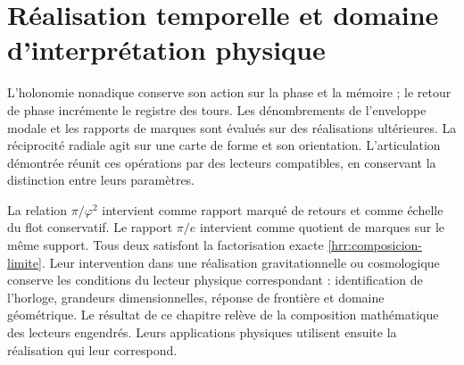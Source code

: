 \section{Réalisation temporelle et domaine d’interprétation physique}

L’holonomie nonadique conserve son action sur la phase et la mémoire ; le retour de phase incrémente le registre des tours. Les dénombrements de l’enveloppe modale et les rapports de marques sont évalués sur des réalisations ultérieures. La réciprocité radiale agit sur une carte de forme et son orientation. L’articulation démontrée réunit ces opérations par des lecteurs compatibles, en conservant la distinction entre leurs paramètres.

La relation \(\pi/\varphi^2\) intervient comme rapport marqué de retours et comme échelle du flot conservatif. Le rapport \(\pi/e\) intervient comme quotient de marques sur le même support. Tous deux satisfont la factorisation exacte \eqref{hrr:composicion-limite}. Leur intervention dans une réalisation gravitationnelle ou cosmologique conserve les conditions du lecteur physique correspondant : identification de l’horloge, grandeurs dimensionnelles, réponse de frontière et domaine géométrique. Le résultat de ce chapitre relève de la composition mathématique des lecteurs engendrés. Leurs applications physiques utilisent ensuite la réalisation qui leur correspond.
